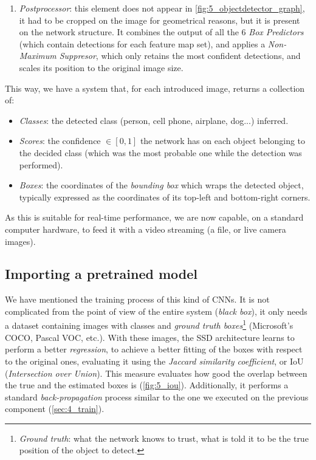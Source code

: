 \begin{enumerate}
			\item \emph{Postprocessor}: this element does not appear in \autoref{fig:5_objectdetector_graph}, it had to be cropped on the image for geometrical reasons, but it is present on the network structure. It combines the output of all the 6 \emph{Box Predictors} (which contain detections for each feature map set), and applies a \emph{Non-Maximum Suppresor}, which only retains the most confident detections, and scales its position to the original image size.
		\end{enumerate}
	
	This way, we have a system that, for each introduced image, returns a collection of:
	\begin{itemize}
		\item \emph{Classes}: the detected class (person, cell phone, airplane, dog...) inferred.
		\item \emph{Scores}: the confidence $\in [0,1]$ the network has on each object belonging to the decided class (which was the most probable one while the detection was performed).
		\item \emph{Boxes}: the coordinates of the \emph{bounding box} which wraps the detected object, typically expressed as the coordinates of its top-left and bottom-right corners.
	\end{itemize}
	
	As this is suitable for real-time performance, we are now capable, on a standard computer hardware, to feed it with a video streaming (a file, or live camera images).
	
	\subsection{Importing a pretrained model}
		We have mentioned the training process of this kind of CNNs. It is not complicated from the point of view of the entire system (\emph{black box}), it only needs a dataset containing images with classes and \emph{ground truth boxes}\footnote{\emph{Ground truth}: what the network knows to trust, what is told it to be the true position of the object to detect.} (Microsoft's COCO, Pascal VOC, etc.). With these images, the SSD architecture learns to perform a better \emph{regression}, to achieve a better fitting of the boxes with respect to the original ones, evaluating it using the \emph{Jaccard similarity coefficient}, or IoU (\emph{Intersection over Union}). This measure evaluates how good the overlap between the true and the estimated boxes is (\autoref{fig:5_iou}). Additionally, it performs a standard \emph{back-propagation} process similar to the one we executed on the previous component (\autoref{sec:4_train}).
		
